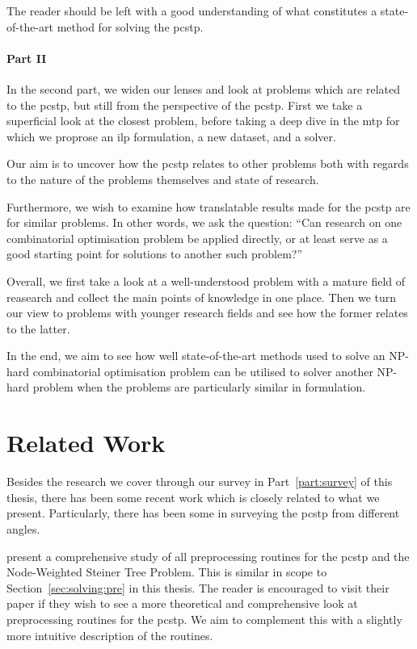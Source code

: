 The reader should be left with a good understanding of
what constitutes a state-of-the-art method for solving the \gls{pcstp}.

\paragraph{Part II}

In the second part, we widen our lenses and look at problems which are related to the \gls{pcstp},
but still from the perspective of
the \gls{pcstp}.
First we take a superficial look at the closest problem,
before taking a deep dive in the \acrlong{mtp} for which
we proprose an \gls{ilp} formulation, a new dataset, and a solver.

Our aim is to uncover how the \gls{pcstp} relates to other problems
both with regards to the nature of the problems themselves and state of
research.

Furthermore, we wish to examine how translatable results made for the \gls{pcstp} are for similar problems.
In other words, we ask the question:
``Can research on one combinatorial optimisation problem be applied directly, or at least
serve as a good starting point for solutions to another such problem?''

\medskip\noindent
Overall, we first take a look at a well-understood problem with a mature field of reasearch and collect
the main points of knowledge in one place. Then we turn our view to problems with younger research fields
and see how the former relates to the latter.

In the end, we aim to see how well state-of-the-art methods used to solve an NP-hard combinatorial
optimisation problem can be utilised to solver another NP-hard problem when the problems are particularly
similar in formulation.

\section{Related Work}
Besides the research we cover through our survey in
Part~\ref{part:survey} of this thesis,
there has been some recent work which is closely related
 to what we present. Particularly, there has been some in surveying the
\acrlong{pcstp} from different angles.

\citet*{rehfeldt2016reduction} present a comprehensive study of all preprocessing routines
for the \gls{pcstp} and the Node-Weighted Steiner Tree Problem. This is similar in scope to
Section~\ref{sec:solving:pre} in this thesis. The reader is encouraged to visit their paper
if they wish to see a more theoretical and comprehensive look at preprocessing routines for
the \gls{pcstp}. We aim to complement this with a slightly more intuitive description of the
routines.

